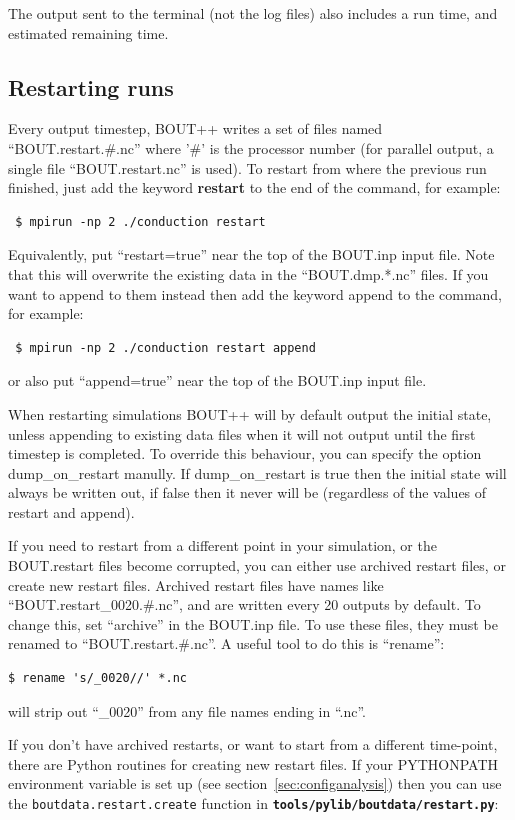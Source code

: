 \documentclass[12pt]{article}
\newcommand{\file}[1]{\texttt{\bf #1}}
\begin{document}
The output sent to the terminal (not the log files) also includes a run time, and estimated
remaining time.

\subsection{Restarting runs}
\label{sec:restarting}

Every output timestep, BOUT++ writes a set of files named ``BOUT.restart.\#.nc''
where '\#' is the processor number (for parallel output, a single file ``BOUT.restart.nc'' is used).
To restart from where the previous run finished, just add the keyword {\bf restart} to the end of the command, for example:
\begin{verbatim}
 $ mpirun -np 2 ./conduction restart
\end{verbatim}
Equivalently, put ``restart=true'' near the top of the BOUT.inp input file. Note that this will
overwrite the existing data in the ``BOUT.dmp.*.nc'' files. If you want to append to them instead
then add the keyword append to the command, for example:
\begin{verbatim}
 $ mpirun -np 2 ./conduction restart append
\end{verbatim}
or also put ``append=true'' near the top of the BOUT.inp input file.

When restarting simulations BOUT++ will by default output the initial state, unless appending to
existing data files when it will not output until the first timestep is completed. To override this
behaviour, you can specify the option dump\_on\_restart manully. If dump\_on\_restart is true then
the initial state will always be written out, if false then it never will be (regardless of the
values of restart and append).

If you need to restart from a different point in your simulation, or the BOUT.restart files
become corrupted, you can either use archived restart files, or create new restart files.
Archived restart files have names like ``BOUT.restart\_0020.\#.nc'', and are written
every 20 outputs by default. To change this, set ``archive'' in the BOUT.inp file.
To use these files, they must be renamed to ``BOUT.restart.\#.nc''. A useful tool
to do this is ``rename'':
\begin{verbatim}
$ rename 's/_0020//' *.nc
\end{verbatim}
will strip out ``\_0020'' from any file names ending in ``.nc''.

If you don't have archived restarts, or want to start from a different time-point,
there are Python routines for creating new restart files. If your PYTHONPATH
environment variable is set up (see section~\ref{sec:configanalysis}) then you can use
the \lstinline!boutdata.restart.create! function in \file{tools/pylib/boutdata/restart.py}:
\end{document}
